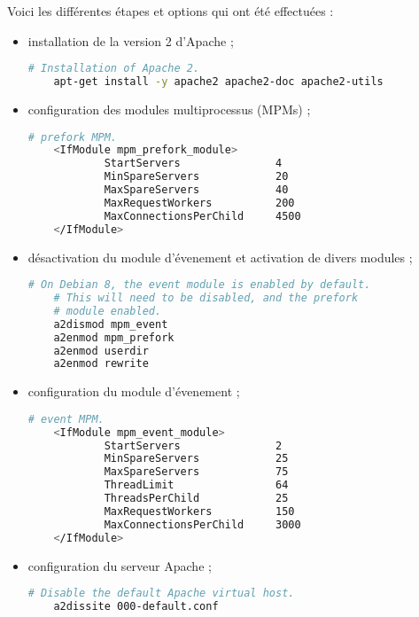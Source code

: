 Voici les différentes étapes et options qui ont été effectuées :
\begin{itemize}
\item installation de la version 2 d'Apache ;

  \begin{lstlisting}[language=bash]
    # Installation of Apache 2.
    apt-get install -y apache2 apache2-doc apache2-utils
  \end{lstlisting}

\item configuration des modules multiprocessus (MPMs) ;

  \begin{lstlisting}[language=bash]
    # prefork MPM.
    <IfModule mpm_prefork_module>
            StartServers               4
            MinSpareServers            20
            MaxSpareServers            40
            MaxRequestWorkers          200
            MaxConnectionsPerChild     4500
    </IfModule>
  \end{lstlisting}

\item désactivation du module d'évenement et activation de divers modules ;

  \begin{lstlisting}[language=bash]
    # On Debian 8, the event module is enabled by default.
    # This will need to be disabled, and the prefork
    # module enabled.
    a2dismod mpm_event
    a2enmod mpm_prefork
    a2enmod userdir
    a2enmod rewrite
  \end{lstlisting}

\item configuration du module d'évenement ;

  \begin{lstlisting}[language=bash]
    # event MPM.
    <IfModule mpm_event_module>
            StartServers               2
            MinSpareServers            25
            MaxSpareServers            75
            ThreadLimit                64
            ThreadsPerChild            25
            MaxRequestWorkers          150
            MaxConnectionsPerChild     3000
    </IfModule>
  \end{lstlisting}

\item configuration du serveur Apache ;

  \begin{lstlisting}[language=bash]
    # Disable the default Apache virtual host.
    a2dissite 000-default.conf


\end{lstlisting}
\end{itemize}
